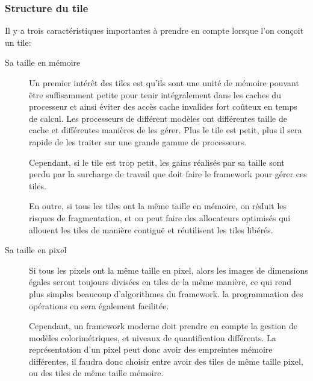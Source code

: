 		\subsubsection{Structure du tile}
			Il y a trois caractéristiques importantes à prendre en compte lorsque l'on conçoit un tile:
			\begin{description}
				\item[Sa taille en mémoire]Un premier intérêt des tiles est qu'ils sont une unité de mémoire pouvant être suffisamment petite
				pour tenir intégralement dans les caches du processeur et ainsi éviter des accès cache invalides fort coûteux en temps de calcul.
				Les processeurs de différent modèles ont différentes taille de cache et différentes manières de les gérer. Plus le tile est petit,
				plus il sera rapide de les traiter sur une grande gamme de processeurs.
				
				Cependant, si le tile est trop petit, les gains réalisés par sa taille sont perdu par la surcharge de travail que doit faire le
				framework pour gérer ces tiles. 

				En outre, si tous les tiles ont la même taille en mémoire, on réduit les risques de fragmentation, et on peut faire des
				allocateurs optimisés qui allouent les tiles de manière contiguë et réutilisent les tiles libérés.

				\item[Sa taille en pixel] Si tous les pixels ont la même taille en pixel, alors les images de dimensions égales seront
				toujours divisées en tiles de la même manière, ce qui rend plus simples beaucoup d'algorithmes du framework.
				la programmation des opérations en sera également facilitée. 

				Cependant, un framework moderne doit prendre en compte la gestion de modèles colorimétriques, et niveaux de quantification
				différents. La représentation d'un pixel peut donc avoir des empreintes mémoire diffé\-rentes, il faudra donc choisir entre
				avoir des tiles de même taille pixel, ou des tiles de même taille mémoire.


\end{description}
